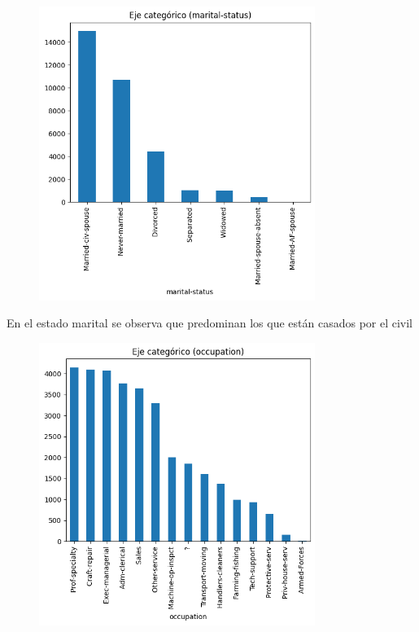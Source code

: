 \documentclass{article}
\begin{document}
	\begin{figure}[H]
		\centering
		\includegraphics[width=0.8\textwidth]{marital-status.png}  
	\end{figure}
	
	En el estado marital se observa que predominan los que están casados por el civil
	
	\begin{figure}[H]
		\centering
		\includegraphics[width=0.8\textwidth]{ocupation.png}  
	\end{figure}
	
\end{document}
